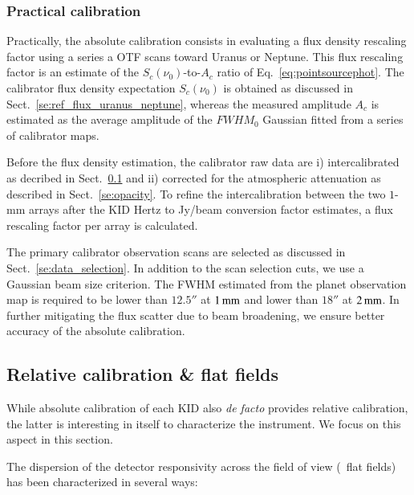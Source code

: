 \subsubsection{Practical calibration}
\label{se:practical_calib}
Practically, the absolute calibration consists in evaluating a flux
density rescaling factor using a series a OTF scans toward
Uranus or Neptune. This flux rescaling factor is an estimate of the
$S_{c}(\nu_{0})$-to-$A_{c}$ ratio of Eq.~\ref{eq:pointsourcephot}. The
calibrator flux density expectation $S_{c}(\nu_{0})$ is obtained as
discussed in Sect.~\ref{se:ref_flux_uranus_neptune}, whereas the measured
amplitude $A_c$ is estimated as the average amplitude of the $FWHM_0$
Gaussian fitted from a series of calibrator maps.

Before the flux density estimation, the calibrator raw data are i)
intercalibrated as decribed in Sect.~\ref{se:flat_field} and ii) corrected for the
atmospheric attenuation as described in Sect.~\ref{se:opacity}. To
refine the intercalibration between the two $1$-mm arrays after the
KID Hertz to Jy/beam conversion factor estimates, a flux rescaling
factor per array is calculated.

The primary calibrator observation scans are selected as discussed in
Sect.~\ref{se:data_selection}. In addition to the scan selection cuts,
we use a Gaussian beam size criterion. The FWHM estimated from the planet
observation map is required to be lower than $12.5''$ at $1\,\rm{mm}$ and lower
than $18''$ at $2\,\rm{mm}$. In further mitigating the flux scatter
due to beam broadening, we ensure better accuracy of the absolute
calibration.



\subsection{Relative calibration \& flat fields}
\label{se:flat_field}
While absolute calibration of each KID also \emph{de facto} provides
relative calibration, the latter is interesting in itself to
characterize the instrument. We focus on this aspect in this
section.

The dispersion of the detector responsivity across the field of view (\aka\ flat
fields) has been characterized in several ways:

